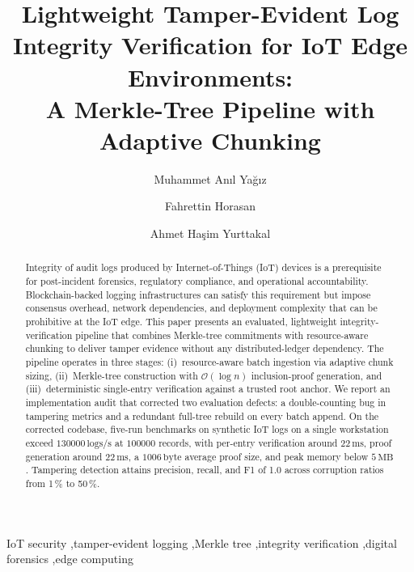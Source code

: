 \documentclass[preprint,12pt]{elsarticle}
\begin{document}

\begin{frontmatter}

\title{Lightweight Tamper-Evident Log Integrity Verification for IoT Edge Environments:\\
       A Merkle-Tree Pipeline with Adaptive Chunking}

\author[inst1,inst3]{Muhammet An\i l Ya\u{g}\i z}

\author[inst1]{Fahrettin Horasan}

\author[inst2]{Ahmet Ha\c{s}im Yurttakal}

\address[inst1]{Department of Computer Engineering, K\i r\i kkale University, K\i r\i kkale, Turkey}
\address[inst2]{Faculty of Engineering, Afyon Kocatepe University, Afyonkarahisar, Turkey}
\address[inst3]{Singularity Research and Development}

\begin{abstract}
Integrity of audit logs produced by Internet-of-Things (IoT) devices is a prerequisite for post-incident forensics, regulatory compliance, and operational accountability.
Blockchain-backed logging infrastructures can satisfy this requirement but impose consensus overhead, network dependencies, and deployment complexity that can be prohibitive at the IoT edge.
This paper presents an evaluated, lightweight integrity-verification pipeline that combines Merkle-tree commitments with resource-aware chunking to deliver tamper evidence without any distributed-ledger dependency.
The pipeline operates in three stages: (i)~resource-aware batch ingestion via adaptive chunk sizing, (ii)~Merkle-tree construction with $\mathcal{O}(\log n)$ inclusion-proof generation, and (iii)~deterministic single-entry verification against a trusted root anchor.
We report an implementation audit that corrected two evaluation defects: a double-counting bug in tampering metrics and a redundant full-tree rebuild on every batch append.
On the corrected codebase, five-run benchmarks on synthetic IoT logs on a single workstation exceed $130000\,\mathrm{logs/s}$ at $100000$ records, with per-entry verification around $22\,\mathrm{ms}$, proof generation around $22\,\mathrm{ms}$, a $1006\,\mathrm{byte}$ average proof size, and peak memory below $5\,\mathrm{MB}$.
Tampering detection attains precision, recall, and F1 of 1.0 across corruption ratios from 1\,\% to 50\,\%.
\end{abstract}

\begin{keyword}
IoT security \sep tamper-evident logging \sep Merkle tree \sep integrity verification \sep digital forensics \sep edge computing
\end{keyword}

\end{frontmatter}
\end{document}
